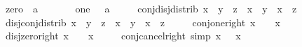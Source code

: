\begin{isabellebody}
\ \ \ \ \ zero\ {\isacharcolon}{\kern0pt}{\isacharcolon}{\kern0pt}\ {\isacartoucheopen}{\isacharprime}{\kern0pt}a{\isacartoucheclose}\ \ {\isacharparenleft}{\kern0pt}{\isacartoucheopen}\isanewline
\ \ \ \ \ one\ \ {\isacharcolon}{\kern0pt}{\isacharcolon}{\kern0pt}\ {\isacartoucheopen}{\isacharprime}{\kern0pt}a{\isacartoucheclose}\ \ {\isacharparenleft}{\kern0pt}{\isacartoucheopen}\isanewline
\ \ \ conj{\isacharunderscore}{\kern0pt}disj{\isacharunderscore}{\kern0pt}distrib{\isacharcolon}{\kern0pt}\ {\isacartoucheopen}x\ \isactrlbold {\isasymsqinter}\ {\isacharparenleft}{\kern0pt}y\ \isactrlbold {\isasymsqunion}\ z{\isacharparenright}{\kern0pt}\ {\isacharequal}{\kern0pt}\ {\isacharparenleft}{\kern0pt}x\ \isactrlbold {\isasymsqinter}\ y{\isacharparenright}{\kern0pt}\ \isactrlbold {\isasymsqunion}\ {\isacharparenleft}{\kern0pt}x\ \isactrlbold {\isasymsqinter}\ z{\isacharparenright}{\kern0pt}{\isacartoucheclose}\isanewline
\ \ \ \ \ disj{\isacharunderscore}{\kern0pt}conj{\isacharunderscore}{\kern0pt}distrib{\isacharcolon}{\kern0pt}\ {\isacartoucheopen}x\ \isactrlbold {\isasymsqunion}\ {\isacharparenleft}{\kern0pt}y\ \isactrlbold {\isasymsqinter}\ z{\isacharparenright}{\kern0pt}\ {\isacharequal}{\kern0pt}\ {\isacharparenleft}{\kern0pt}x\ \isactrlbold {\isasymsqunion}\ y{\isacharparenright}{\kern0pt}\ \isactrlbold {\isasymsqinter}\ {\isacharparenleft}{\kern0pt}x\ \isactrlbold {\isasymsqunion}\ z{\isacharparenright}{\kern0pt}{\isacartoucheclose}\isanewline
\ \ \ \ \ conj{\isacharunderscore}{\kern0pt}one{\isacharunderscore}{\kern0pt}right{\isacharcolon}{\kern0pt}\ {\isacartoucheopen}x\ \isactrlbold {\isasymsqinter}\ \ {\isacharequal}{\kern0pt}\ x{\isacartoucheclose}\isanewline
\ \ \ \ \ disj{\isacharunderscore}{\kern0pt}zero{\isacharunderscore}{\kern0pt}right{\isacharcolon}{\kern0pt}\ {\isacartoucheopen}x\ \isactrlbold {\isasymsqunion}\ \ {\isacharequal}{\kern0pt}\ x{\isacartoucheclose}\isanewline
\ \ \ \ \ conj{\isacharunderscore}{\kern0pt}cancel{\isacharunderscore}{\kern0pt}right\ {\isacharbrackleft}{\kern0pt}simp{\isacharbrackright}{\kern0pt}{\isacharcolon}{\kern0pt}\ {\isacartoucheopen}x\ \isactrlbold {\isasymsqinter}\ \isactrlbold {\isacharminus}{\kern0pt}\ x\ {\isacharequal}{\kern0pt}\ \isanewline

\end{isabellebody}
